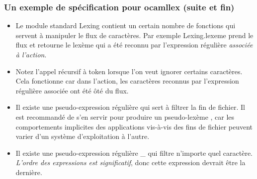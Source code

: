%
\begin{frame}
\frametitle{Un exemple de spécification pour ocamllex (suite et fin)}

\begin{itemize}

  \item Le module standard \textsf{Lexing} contient un certain nombre
  de fonctions qui servent à manipuler le flux de caractères. Par
  exemple \textsf{Lexing.lexeme} prend le flux et retourne le lexème
  qui a été reconnu par l'expression régulière \emph{associée à l'action}.

  \item Notez l'appel récursif à \textsf{token} lorsque l'on veut
  ignorer certains caractères. Cela fonctionne car dans l'action, les
  caractères reconnus par l'expression régulière associée ont été ôté
  du flux.

  \item Il existe une pseudo-expression régulière  qui
  sert à filtrer la fin de fichier. Il est recommandé de s'en servir
  pour produire un pseudo-lexème \Teof, car les comportements
  implicites des applications vis-à-vis des fins de fichier peuvent
  varier d'un système d'exploitation à l'autre.

  \item Il existe une pseudo-expression régulière \textsf{\large \_}
  qui filtre n'importe quel caractère. \emph{L'ordre des expressions
  est significatif}, donc cette expression devrait être la dernière.

\end{itemize}

\end{frame}

